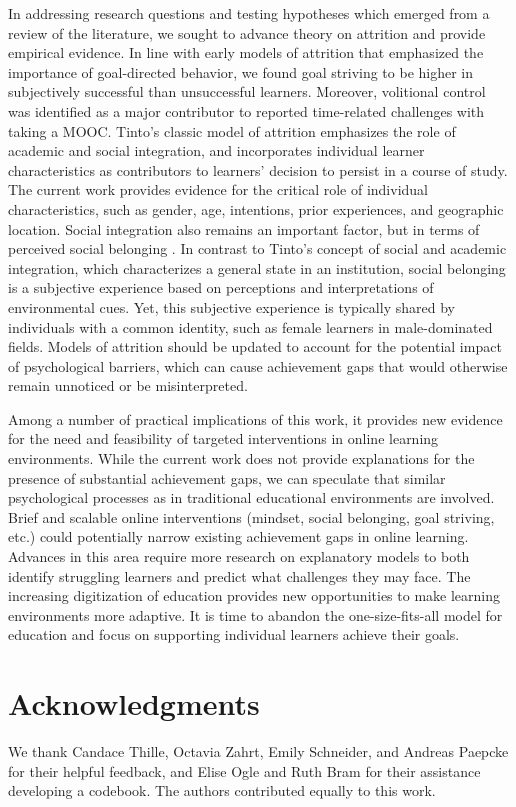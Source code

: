 \documentclass{sigchi}\usepackage[]{graphicx}\usepackage[]{color}
\begin{document}
In addressing research questions and testing hypotheses which emerged from a review of the literature, we sought to advance theory on attrition and provide empirical evidence. In line with early models of attrition that emphasized the importance of goal-directed behavior, we found goal striving to be higher in subjectively successful than unsuccessful learners. Moreover, volitional control was identified as a major contributor to reported time-related challenges with taking a MOOC. Tinto's \cite{tinto1975dropout} classic model of attrition emphasizes the role of academic and social integration, and incorporates individual learner characteristics as contributors to learners' decision to persist in a course of study. The current work provides evidence for the critical role of individual characteristics, such as gender, age, intentions, prior experiences, and geographic location. Social integration also remains an important factor, but in terms of perceived social belonging \cite{walton2007question}. In contrast to Tinto's concept of social and academic integration, which characterizes a general state in an institution, social belonging is a subjective experience based on perceptions and interpretations of environmental cues. Yet, this subjective experience is typically shared by individuals with a common identity, such as female learners in male-dominated fields. Models of attrition should be updated to account for the potential impact of psychological barriers, which can cause achievement gaps that would otherwise remain unnoticed or be misinterpreted. 

Among a number of practical implications of this work, it provides new evidence for the need and feasibility of targeted interventions in online learning environments. While the current work does not provide explanations for the presence of substantial achievement gaps, we can speculate that similar psychological processes as in traditional educational environments are involved. Brief and scalable online interventions (mindset, social belonging, goal striving, etc.) could potentially narrow existing achievement gaps in online learning. Advances in this area require more research on explanatory models to both identify struggling learners and predict what challenges they may face. The increasing digitization of education provides new opportunities to make learning environments more adaptive. It is time to abandon the one-size-fits-all model for education and focus on supporting individual learners achieve their goals.


\section{Acknowledgments}
We thank Candace Thille, Octavia Zahrt, Emily Schneider, and Andreas Paepcke for their helpful feedback, and Elise Ogle and Ruth Bram for their assistance developing a codebook. The authors contributed equally to this work.

\balance



\end{document}
